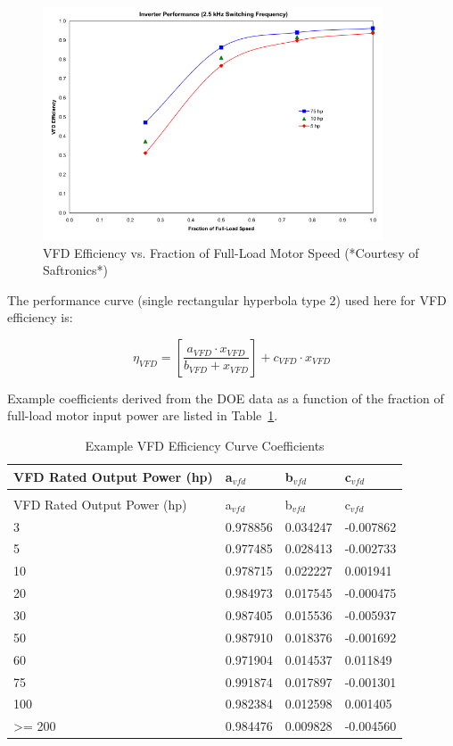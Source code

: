 \begin{figure}[hbtp] %
\centering
\includegraphics[width=0.9\textwidth, height=0.9\textheight, keepaspectratio=true]{media/image4924.svg.png}
\caption{VFD Efficiency vs. Fraction of Full-Load Motor Speed (*Courtesy of Saftronics*) \protect \label{fig:vfd-efficiency-vs.-fraction-of-full-load}}
\end{figure}

The performance curve (single rectangular hyperbola type 2) used here for VFD efficiency is:

\begin{equation}
{\eta_{VFD}} = \left[ {\frac{{{a_{VFD}} \cdot {x_{VFD}}}}{{{b_{VFD}} + {x_{VFD}}}}} \right] + {c_{VFD}} \cdot {x_{VFD}}
\end{equation}

Example coefficients derived from the DOE data as a function of the fraction of full-load motor input power are listed in Table~\ref{table:example-vfd-efficiency-curve-coefficients}.

\begin{longtable}[c]{@{}llll@{}}
\caption{Example VFD Efficiency Curve Coefficients \label{table:example-vfd-efficiency-curve-coefficients}} \tabularnewline
\toprule 
VFD Rated Output Power (hp) & a\(_{vfd}\) & b\(_{vfd}\) & c\(_{vfd}\) \tabularnewline \midrule
\midrule
\endfirsthead

\caption[]{Example VFD Efficiency Curve Coefficients} \tabularnewline
\toprule 
VFD Rated Output Power (hp) & a\(_{vfd}\) & b\(_{vfd}\) & c\(_{vfd}\) \tabularnewline \midrule
\midrule
\endhead

3 & 0.978856 & 0.034247 & -0.007862 \tabularnewline
5 & 0.977485 & 0.028413 & -0.002733 \tabularnewline
10 & 0.978715 & 0.022227 & 0.001941 \tabularnewline
20 & 0.984973 & 0.017545 & -0.000475 \tabularnewline
30 & 0.987405 & 0.015536 & -0.005937 \tabularnewline
50 & 0.987910 & 0.018376 & -0.001692 \tabularnewline
60 & 0.971904 & 0.014537 & 0.011849 \tabularnewline
75 & 0.991874 & 0.017897 & -0.001301 \tabularnewline
100 & 0.982384 & 0.012598 & 0.001405 \tabularnewline
>= 200 & 0.984476 & 0.009828 & -0.004560 \tabularnewline
\bottomrule
\end{longtable}

